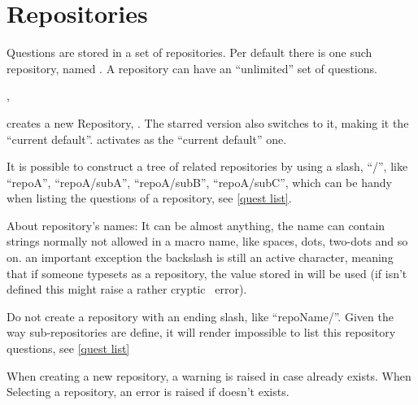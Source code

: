 \documentclass[10pt]{article}
\begin{document}
\section{Repositories}\label{repositories}
Questions are stored in a set of repositories. Per default there is one such repository, named . A repository can have an ``unlimited'' set of questions.

\begin{codedescribe}{,\SelectRepository}
\begin{codesyntax}%
\end{codesyntax}
 creates a new Repository, . The starred version also switches to it, making it the ``current default''.
\tsobj{\SelectRepository} activates  as the ``current default'' one.

It is possible to construct a tree of related repositories by using a slash, ``/'', like ``repoA'', ``repoA/subA'', ``repoA/subB'', ``repoA/subC'', which can be handy when listing the questions of a repository, see \ref{quest list}.
\end{codedescribe}

\begin{tsremark}
About repository's names: It can be almost anything, the name can contain strings normally not allowed in a macro name, like spaces, dots, two-dots and so on. an important exception the backslash is still an active character, meaning that if someone typesets \tsobj{\XYZ} as a repository, the value stored in \tsobj{\XYZ} will be used (if \tsobj{\XYZ} isn't defined this might raise a rather cryptic \LaTeXe\ error).
\end{tsremark}

\begin{tsremark}
Do not create a repository with an ending slash, like ``repoName/''. Given the way sub-repositories are define, it will render impossible to list this repository questions, see \ref{quest list}
\end{tsremark}


\begin{tsremark}
When creating a new repository, a warning is raised  in case  already exists. 
When Selecting a repository, an error is raised if  doesn't exists.
\end{tsremark}
\end{document}

